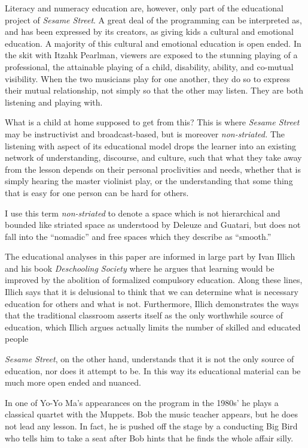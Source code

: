\documentclass[12pt,letterpaper]{article}
\begin{document}
	Literacy and numeracy education are, however, only part of the 
	educational project of \textit{Sesame Street}. A great deal of the 
	programming can be interpreted as, and has been expressed by its 
	creators, as giving kids a cultural and emotional 
	education.\autocite[297]{Ostrofsky2012}
	A majority of this cultural and emotional education is open ended. 
	In the skit with Itzahk Pearlman, viewers are exposed to the stunning 
	playing of a professional, the attainable playing of a child, 
	disability, ability, and co-mutual visibility. When the two musicians 
	play for one another, they do so to express their mutual relationship, 
	not simply so that the other may listen. They are both listening and 
	playing with. 

	What is a child at home supposed to get from this? This is where 
	\textit{Sesame Street} may be instructivist and broadcast-based, but 
	is moreover \textit{non-striated.} The listening with aspect of its 
	educational model drops the learner into an existing network of 
	understanding, discourse, and culture, such that what they take away
	from the lesson depends on their personal proclivities and needs, 
	whether that is simply hearing the master violinist play, or the 
	understanding that some thing that is easy for one person can be hard 
	for others.

	I use this term \textit{non-striated} to denote a space which is not
	hierarchical and bounded like striated space as understood by Deleuze 
	and Guatari, but does not fall into the ``nomadic'' and free spaces 
	which they describe as ``smooth.'' 

	The educational analyses in this paper are informed in large part by 
	Ivan Illich and his book \textit{Deschooling Society} where he argues
	that learning would be improved by the abolition of formalized
	compulsory education. Along these lines, Illich says that it is 
	delusional to think that we can determine what is necessary education 
	for others and what is not.\autocite[12]{Illich} Furthermore, Illich 
	demonstrates the ways that the traditional classroom asserts itself as
	the only worthwhile source of education, which Illich argues actually 
	limits the number of skilled and educated people\autocite[39]{Illich} 
		
	\textit{Sesame Street}, on the other hand, understands that it is not 
	the only source of education, nor does it attempt to be. In this way its
	educational material can be much more open ended and nuanced. 

	In one of Yo-Yo Ma's appearances on the program in the 1980s' he plays
	a classical quartet with the Muppets. Bob the music teacher appears, 
	but he does not lead any lesson. In fact, he is pushed off the stage by 
	a conducting Big Bird who tells him to take a seat after Bob hints that
	he finds the whole affair silly.
\end{document}
